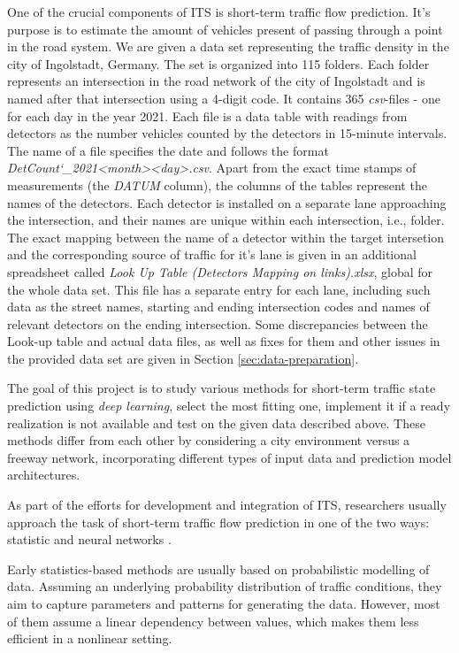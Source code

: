 One of the crucial components of ITS is short-term traffic flow prediction. It's
purpose is to estimate the amount of vehicles present of passing through a point
in the road system. We are given a data set representing the traffic density in
the city of Ingolstadt, Germany. The set is organized into 115 folders. Each
folder represents an intersection in the road network of the city of Ingolstadt
and is named after that intersection using a 4-digit code. It contains 365
\textit{csv}-files - one for each day in the year 2021. Each file is a data
table with readings from detectors as the number vehicles counted by the
detectors in 15-minute intervals. The name of a file specifies the date and
follows the format \textit{DetCount\char`_2021<month><day>.csv}. Apart from the
exact time stamps of measurements (the \textit{DATUM} column), the columns of
the tables represent the names of the detectors. Each detector is installed on a
separate lane approaching the intersection, and their names are unique within
each intersection, i.e., folder. The exact mapping between the name of a
detector within the target intersetion and the corresponding source of traffic
for it's lane is given in an additional spreadsheet called
\textit{Look Up Table (Detectors Mapping on links).xlsx}, global for the whole
data set. This file has a separate entry for each lane, including such data as
the street names, starting and ending intersection codes and names of relevant
detectors on the ending intersection. Some discrepancies between the Look-up
table and actual data files, as well as fixes for them and other issues in the
provided data set are given in Section \ref{sec:data-preparation}.

The goal of this project is to study various methods for short-term traffic
state prediction using \textit{deep learning}, select the most fitting one,
implement it if a ready realization is not available and test on the given data
described above. These methods differ from each other by considering a city
environment versus a freeway network, incorporating different types of input
data and prediction model architectures.

As part of the efforts for development and integration of ITS, researchers
usually approach the task of short-term traffic flow prediction in one of the
two ways: statistic and neural networks \cite{Karlaftis.2011}.

Early statistics-based methods are usually based on probabilistic modelling of 
data. Assuming an underlying probability distribution of traffic conditions,
they aim to capture parameters and patterns for generating the data. However,
most of them assume a linear dependency between values, which makes them less
efficient in a nonlinear setting.


